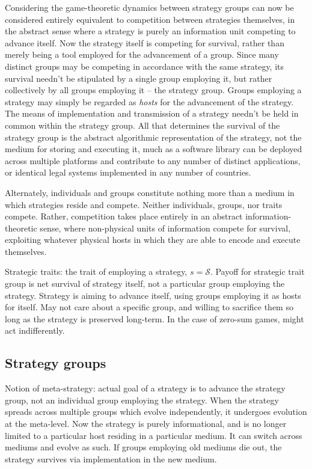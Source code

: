 \documentclass[twocolumn, aps, rmp, amsmath, amssymb, nofootinbib, superscriptaddress, longbibliography, floatfix, table-of-contents, eqsecnum]{revtex4-1}
\begin{document}
Considering the game-theoretic dynamics between strategy groups can now be considered entirely equivalent to competition between strategies themselves, in the abstract sense where a strategy is purely an information unit competing to advance itself. Now the strategy itself is competing for survival, rather than merely being a tool employed for the advancement of a group. Since many distinct groups may be competing in accordance with the same strategy, its survival needn't be stipulated by a single group employing it, but rather collectively by all groups employing it -- the strategy group. Groups employing a strategy may simply be regarded as \textit{hosts} for the advancement of the strategy. The means of implementation and transmission of a strategy needn't be held in common within the strategy group. All that determines the survival of the strategy group is the abstract algorithmic representation of the strategy, not the medium for storing and executing it, much as a software library can be deployed across multiple platforms and contribute to any number of distinct applications, or identical legal systems implemented in any number of countries.

Alternately, individuals and groups constitute nothing more than a medium in which strategies reside and compete. Neither individuals, groups, nor traits compete. Rather, competition takes place entirely in an abstract information-theoretic sense, where non-physical units of information compete for survival, exploiting whatever physical hosts in which they are able to encode and execute themselves.

Strategic traits: the trait of employing a strategy, $s=\mathcal{S}$. Payoff for strategic trait group is net survival of strategy itself, not a particular group employing the strategy. Strategy is aiming to advance itself, using groups employing it as hosts for itself. May not care about a specific group, and willing to sacrifice them so long as the strategy is preserved long-term. In the case of zero-sum games, might act indifferently.

\subsection{Strategy groups}

Notion of meta-strategy: actual goal of a strategy is to advance the strategy group, not an individual group employing the strategy. When the strategy spreads across multiple groups which evolve independently, it undergoes evolution at the meta-level. Now the strategy is purely informational, and is no longer limited to a particular host residing in a particular medium. It can switch across mediums and evolve as such. If groups employing old mediums die out, the strategy survives via implementation in the new medium.
\end{document}
